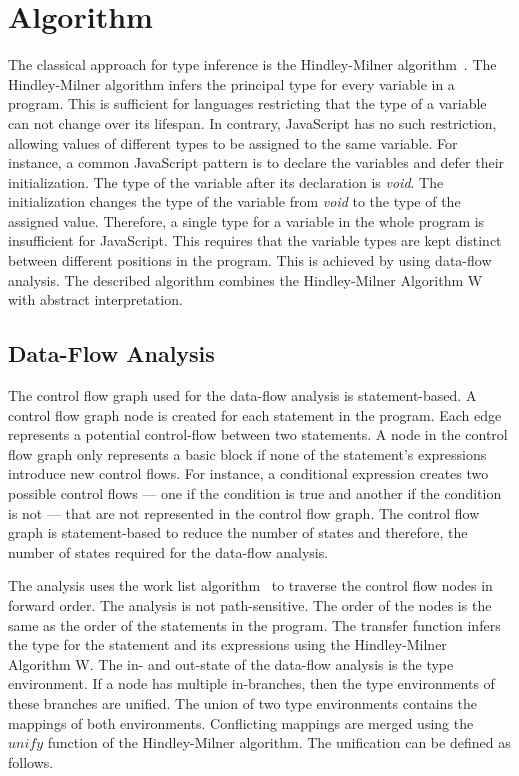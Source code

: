 \section{Algorithm}\label{sec:algorithm}
The classical approach for type inference is the Hindley-Milner algorithm~\cite{Milner1978}. The Hindley-Milner algorithm infers the principal type for every variable in a program. This is sufficient for languages restricting that the type of a variable can not change over its lifespan. In contrary, JavaScript has no such restriction, allowing values of different types to be assigned to the same variable. For instance, a common JavaScript pattern is to declare the variables and defer their initialization. The type of the variable after its declaration is \textit{void}. The initialization changes the type of the variable from \textit{void} to the type of the assigned value. Therefore, a single type for a variable in the whole program is insufficient for JavaScript. This requires that the variable types are kept distinct between different positions in the program. This is achieved by using data-flow analysis. The described algorithm combines the Hindley-Milner Algorithm W with abstract interpretation. 

\subsection{Data-Flow Analysis}

The control flow graph used for the data-flow analysis is statement-based. A control flow graph node is created for each statement in the program. Each edge represents a potential control-flow between two statements. A node in the control flow graph only represents a basic block if none of the statement's expressions introduce new control flows. For instance, a conditional expression creates two possible control flows --- one if the condition is true and another if the condition is not --- that are not represented in the control flow graph. The control flow graph is statement-based to reduce the number of states and therefore, the number of states required for the data-flow analysis.

The analysis uses the work list algorithm~\cite{NielsonNielsonHankin1999} to traverse the control flow nodes in forward order. The analysis is not path-sensitive. The order of the nodes is the same as the order of the statements in the program. The transfer function infers the type for the statement and its expressions using the Hindley-Milner Algorithm W.  The in- and out-state of the data-flow analysis is the type environment. If a node has multiple in-branches, then the type environments of these branches are unified. The union of two type environments contains the mappings of both environments. Conflicting mappings are merged using the $unify$ function of the Hindley-Milner algorithm. The unification can be defined as follows.


